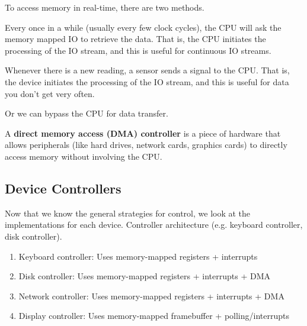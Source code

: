   To access memory in real-time, there are two methods. 

  \begin{definition}[Polling]
    Every once in a while (usually every few clock cycles), the CPU will ask the memory mapped IO to retrieve the data. That is, the CPU initiates the processing of the IO stream, and this is useful for continuous IO streams. 
  \end{definition}

  \begin{definition}[Interrupts]
    Whenever there is a new reading, a sensor sends a signal to the CPU. That is, the device initiates the processing of the IO stream, and this is useful for data you don't get very often. 
  \end{definition}

  Or we can bypass the CPU for data transfer. 

  \begin{definition}
    A \textbf{direct memory access (DMA) controller} is a piece of hardware that allows peripherals (like hard drives, network cards, graphics cards) to directly access memory without involving the CPU. 
  \end{definition}

  \begin{example}
    
  \end{example}

\subsection{Device Controllers}

  Now that we know the general strategies for control, we look at the implementations for each device. Controller architecture (e.g. keyboard controller, disk controller). 
  \begin{enumerate}
    \item Keyboard controller: Uses memory-mapped registers + interrupts
    \item Disk controller: Uses memory-mapped registers + interrupts + DMA
    \item Network controller: Uses memory-mapped registers + interrupts + DMA
    \item Display controller: Uses memory-mapped framebuffer + polling/interrupts
  \end{enumerate}

